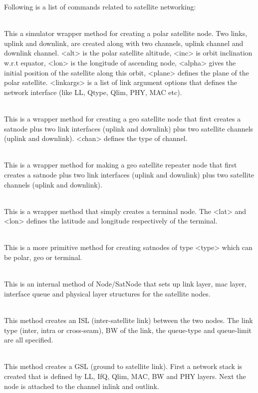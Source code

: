 Following is a list of commands related to satellite networking:
\begin{flushleft}
\\
This a simulator wrapper method for creating a polar satellite node. Two
links, uplink and downlink, are created along with two channels, uplink
channel and downlink channel. <alt> is the polar satellite altitude,
<inc> is orbit inclination w.r.t equator, <lon> is the longitude of 
ascending node, <alpha>
gives the initial position of the satellite along this orbit, <plane> 
defines the plane of
the polar satellite. <linkargs> is a list of link argument options that
defines the network interface (like LL, Qtype, Qlim, PHY, MAC etc).


\\
This is a wrapper method for creating a geo satellite node that first
creates a satnode plus two link interfaces (uplink and downlink) plus two 
satellite channels (uplink and downlink). <chan> defines the type of
channel.


\\
This is a wrapper method for making a geo satellite repeater node that 
first creates a satnode plus two link interfaces (uplink and downlink)
plus two satellite channels (uplink and downlink). 


\\
This is a wrapper method that simply creates a terminal node. The <lat>
and <lon> defines the latitude and longitude respectively of the terminal.


\\
This is a more primitive method for creating satnodes of type <type>
which can be polar, geo or terminal. 


\\
This is an internal method of Node/SatNode that sets up link layer, mac
layer, interface queue and physical layer structures for the satellite
nodes.


\\
This method creates an ISL (inter-satellite link) between the two nodes.
The link type (inter, intra or cross-seam), BW of the link, the queue-type
and queue-limit are all specified.


\\
This method creates a GSL (ground to satellite link). First a network
stack is created that is defined by LL, IfQ, Qlim, MAC, BW and PHY layers.
Next the node is attached to the channel inlink and outlink.


\end{flushleft}

\endinput


